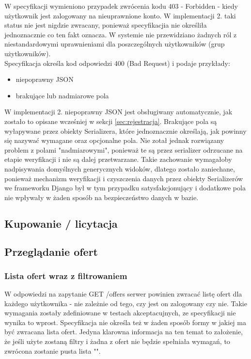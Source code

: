 \documentclass[12pt, notitlepage]{article}
\begin{document}
W specyfikacji wymieniono przypadek zwrócenia kodu 403 - Forbidden - kiedy użytkownik jest zalogowany na nieuprawnione konto. W implementacji 2. taki status nie jest nigdzie zwracany, ponieważ specyfikacjia nie określiła jednoznacznie co ten fakt oznacza. W systemie nie przewidziano żadnych ról z niestandardowymi uprawnieniami dla poszczególnych użytkowników (grup użytkowników). \\

Specyfikacja określa kod odpowiedzi 400 (Bad Request) i podaje przykłady:
\begin{itemize}
    \item niepoprawny JSON
    \item brakujące lub nadmiarowe pola
\end{itemize}
W implementacji 2. niepoprawny JSON jest obsługiwany automatycznie, jak zostało to opisane wcześniej w sekcji \ref{sec:rejestracja}. Brakujące pola są wyłapywane przez obiekty Serializera, które jednoznacznie określają, jak powinny się nazywać wymagane oraz opcjonalne pola. Nie zotał jednak rozwiązany problem z polami "nadmiarowymi", ponieważ te są przez serializer odrzucane na etapie weryfikacji i nie są dalej przetwarzane. Takie zachowanie wymagałoby nadpisywania domyślnych generycznych widoków, dlatego zostało zaniechane, ponieważ mechanizm weryfikacji i czyszczenia danych przez obiekty Serializerów we frameworku Django był w tym przypadku satysfakcjonujący i dodatkowe pola nie wpływały w żaden sposób na bezpieczeństwo danych w bazie.

\subsection{Kupowanie / licytacja}
\subsection{Przeglądanie ofert}
\subsubsection{Lista ofert wraz z filtrowaniem}\label{sec:search}
W odpowiedzi na zapytanie GET /offers serwer powinien zwracać listę ofert dla każdego użytkownika - nie zależnie od tego, czy jest on zalogowany czy nie. Takie wymagania zostały zdefiniowane w testach akceptacujnych, ze specyfikacji nie wynika to wprost. Specyfikacja nie określa też w żaden sposób formy w jakiej ma być zwracana lista ofert. Jedyna klarowna informacja na ten temat to założenie, że jeśli użyte zostaną filtry i żadna z ofert nie będzie spełniała wymagań, to zwrócona zostanie pusta lista "\lbrack\rbrack". \\
\end{document}
